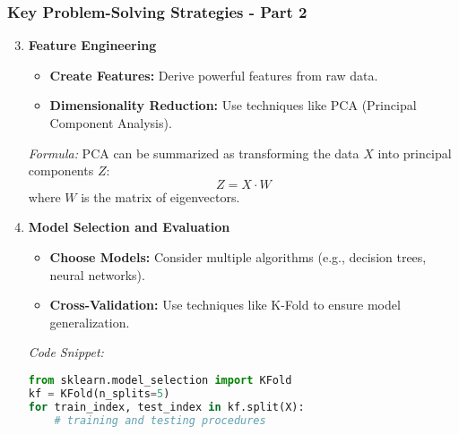 \documentclass[aspectratio=169]{beamer}
\begin{document}
\begin{frame}[fragile]
    \frametitle{Key Problem-Solving Strategies - Part 2}
    \begin{enumerate}
        \setcounter{enumi}{2}
        \item \textbf{Feature Engineering}
            \begin{itemize}
                \item \textbf{Create Features:} Derive powerful features from raw data. 
                \item \textbf{Dimensionality Reduction:} Use techniques like PCA (Principal Component Analysis).
            \end{itemize}
            \pause
            \textit{Formula:} PCA can be summarized as transforming the data \(X\) into principal components \(Z\):
            \begin{equation}
                Z = X \cdot W
            \end{equation}
            where \(W\) is the matrix of eigenvectors.
            
        \item \textbf{Model Selection and Evaluation}
            \begin{itemize}
                \item \textbf{Choose Models:} Consider multiple algorithms (e.g., decision trees, neural networks).
                \item \textbf{Cross-Validation:} Use techniques like K-Fold to ensure model generalization.
            \end{itemize}
            \pause
            \textit{Code Snippet:}
            \begin{lstlisting}[language=Python]
from sklearn.model_selection import KFold
kf = KFold(n_splits=5)
for train_index, test_index in kf.split(X):
    # training and testing procedures
            \end{lstlisting}
    \end{enumerate}
\end{frame}
\end{document}
